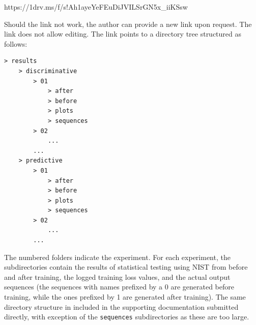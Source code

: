 \documentclass[12pt, titlepage]{report}
\theoremstyle{definition}
\begin{document}
https://1drv.ms/f/s!Ah1ayeYeFEuDiJVILSrGN5x\_iiKSsw

Should the link not work, the author can provide a new link upon request. The link does not allow editing. The link points to a directory tree structured as follows:

\begin{verbatim}   
> results
    > discriminative
        > 01
            > after
            > before
            > plots
            > sequences            
        > 02
            ...
        ...
    > predictive
        > 01
            > after
            > before
            > plots
            > sequences
        > 02
            ...
        ...
\end{verbatim}

The numbered folders indicate the experiment. For each experiment, the subdirectories contain the results of statistical testing using NIST from before and after training, the logged training loss values, and the actual output sequences (the sequences with names prefixed by a 0 are generated before training, while the ones prefixed by 1 are generated after training). The same directory structure in included in the supporting documentation submitted directly, with exception of the \texttt{sequences} subdirectories as these are too large.
\end{document}
